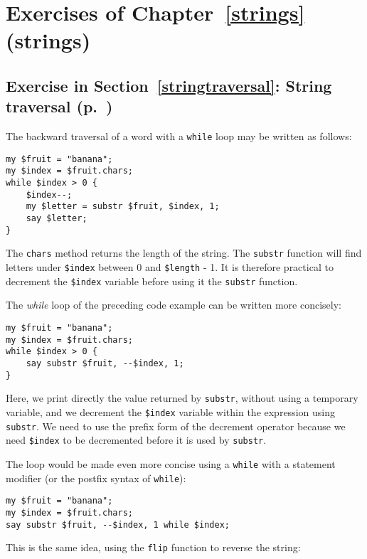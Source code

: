 \section{Exercises of Chapter~\ref{strings} (strings)}

\subsection{Exercise in Section~\ref{stringtraversal}: String traversal (p.~\pageref{stringtraversal})}
\label{sol_stringtraversal}

The backward traversal of a word with a {\tt while} loop may
be written as follows:

\begin{verbatim}
my $fruit = "banana";
my $index = $fruit.chars;
while $index > 0 { 
    $index--;
    my $letter = substr $fruit, $index, 1; 
    say $letter; 
}
\end{verbatim}
%

The {\tt chars} method returns the length of the string. The 
{\tt substr} function will find letters under \verb'$index' 
between 0 and \verb'$length' - 1. It is therefore practical 
to decrement the \verb'$index' variable before using it the
{\tt substr} function. 

The \emph{while} loop of the preceding code example can be 
written more concisely:

\begin{verbatim}
my $fruit = "banana";
my $index = $fruit.chars;
while $index > 0 { 
    say substr $fruit, --$index, 1; 
}
\end{verbatim}
%

Here, we print directly the value returned by {\tt substr}, 
without using a temporary variable, and we decrement the 
\verb'$index' variable within the expression using {\tt substr}.
We need to use the prefix form of the decrement operator 
because we need \verb'$index' to be decremented before it is 
used by {\tt substr}.

The loop would be made even more concise using a {\tt while} with 
a statement modifier (or the postfix syntax of {\tt while}):

\begin{verbatim}
my $fruit = "banana";
my $index = $fruit.chars;
say substr $fruit, --$index, 1 while $index;
\end{verbatim}
%

This is the same idea, using the {\tt flip} function to 
reverse the string:

